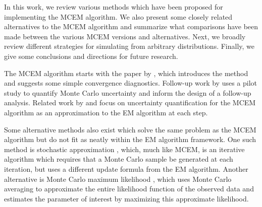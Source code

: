 \documentclass[11pt, oneside]{article}   	%
\begin{document}
In this work, we review various methods which have been proposed for implementing the MCEM algorithm. We also present some closely related alternatives to the MCEM algorithm and summarize what comparisons have been made between the various MCEM versions and alternatives. Next, we broadly review different strategies for simulating from arbitrary distributions. Finally, we give some conclusions and directions for future research.


The MCEM algorithm starts with the paper by \citet{Wei90}, which introduces the method and suggests some simple convergence diagnostics. Follow-up work by \citet{Cha95} uses a pilot study to quantify Monte Carlo uncertainty and inform the design of a follow-up analysis. Related work by \citet{Boo99} and \citet{Caf05} focus on uncertainty quantification for the MCEM algorithm as an approximation to the EM algorithm at each step.

Some alternative methods also exist which solve the same problem as the MCEM algorithm but do not fit as neatly within the EM algorithm framework. One such method is stochastic approximation \citep{Gu98I, Rob51}, which, much like MCEM, is an iterative algorithm which requires that a Monte Carlo sample be generated at each iteration, but uses a different update formula from the EM algorithm. Another alternative is Monte Carlo maximum likelihood \citep{Gey91}, which uses Monte Carlo averaging to approximate the entire likelihood function of the observed data and estimates the parameter of interest by maximizing this approximate likelihood.

\end{document}
